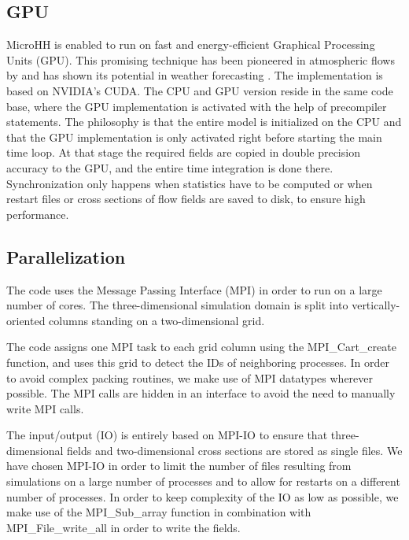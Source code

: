 \documentclass[gmd,manuscript]{copernicus}
\begin{document}
\subsection{GPU}
MicroHH is enabled to run on fast and energy-efficient Graphical Processing Units (GPU). This promising technique has been pioneered in atmospheric flows by \citet{Schalkwijk2012} and has shown its potential in weather forecasting \citep{Schalkwijk2015}. The implementation is based on NVIDIA's CUDA. The CPU and GPU version reside in the same code base, where the GPU implementation is activated with the help of precompiler statements. The philosophy is that the entire model is initialized on the CPU and that the GPU implementation is only activated right before starting the main time loop. At that stage the required fields are copied in double precision accuracy to the GPU, and the entire time integration is done there. Synchronization only happens when statistics have to be computed or when restart files or cross sections of flow fields are saved to disk, to ensure high performance.

\subsection{Parallelization}
The code uses the Message Passing Interface (MPI) in order to run on a large number of cores. The three-dimensional simulation domain is split into vertically-oriented columns standing on a two-dimensional grid.

The code assigns one MPI task to each grid column using the MPI\_Cart\_create function, and uses this grid to detect the IDs of neighboring processes. In order to avoid complex packing routines, we make use of MPI datatypes wherever possible. The MPI calls are hidden in an interface to avoid the need to manually write MPI calls.

The input/output (IO) is entirely based on MPI-IO to ensure that three-dimensional fields and two-dimensional cross sections are stored as single files. We have chosen MPI-IO in order to limit the number of files resulting from simulations on a large number of processes and to allow for restarts on a different number of processes. In order to keep complexity of the IO as low as possible, we make use of the MPI\_Sub\_array function in combination with MPI\_File\_write\_all in order to write the fields.
\end{document}
